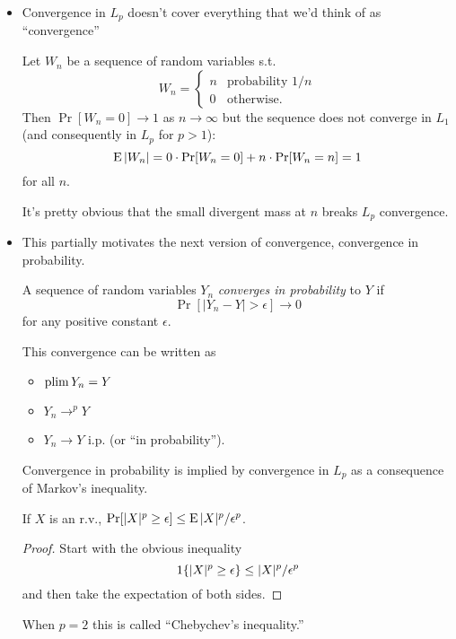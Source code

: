 \begin{itemize}[leftmargin=0pt]

\item Convergence in $L_p$ doesn't cover everything that we'd think of
  as ``convergence''
  \begin{ex}
    Let $W_n$ be a sequence of random variables s.t.
    \begin{equation*}
      W_n =
      \begin{cases}
        n & \text{probability } 1/n \\
        0 & \text{otherwise}.
      \end{cases}
    \end{equation*}
    Then $\Pr[W_n = 0] \to 1$ as $n \to \infty$ but the sequence does not
    converge in $L_1$ (and consequently in $L_p$ for $p > 1$):
    \begin{equation*}
      \operatorname{E} | W_n | = 0 \cdot \operatorname{Pr}[W_n = 0] + n \cdot \operatorname{Pr}[W_n = n] = 1
    \end{equation*}
    for all $n$.
  \end{ex}
  It's pretty obvious that the small divergent mass at $n$ breaks
  $L_p$ convergence.

\item This partially motivates the next version of convergence,
  convergence in probability.
  \begin{defn}
    A sequence of random variables $Y_n$ \emph{converges in
    probability} to $Y$ if
    \begin{equation*}
      \Pr[ | Y_n - Y | > \epsilon] \to 0
    \end{equation*}
    for any positive constant $\epsilon$.
  \end{defn}
  This convergence can be written as
  \begin{itemize}
  \item $\operatorname*{plim} Y_n = Y$
  \item $Y_n \to^p Y$
  \item $Y_n \to Y$ i.p. (or ``in probability'').
  \end{itemize}

  Convergence in probability is implied by convergence in $L_p$
  as a consequence of Markov's inequality.
  \begin{thm}
    If $X$ is an r.v., $\operatorname{Pr}[ |X|^p \geq \epsilon ] \leq \operatorname{E} |X|^p /\epsilon^p$.
  \end{thm}
  \begin{proof}
    Start with the obvious inequality
    \begin{equation*}
      \operatorname{1}\{ |X|^p \geq \epsilon \} \leq |X|^p / \epsilon^p
    \end{equation*}
    and then take the expectation of both sides.
  \end{proof}
  When $p = 2$ this is called ``Chebychev's inequality.''


\end{itemize}
